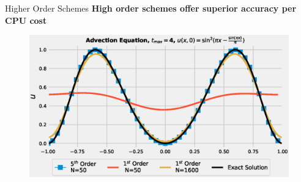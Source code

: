 \documentclass[10pt]{beamer}
\begin{document}
\begin{frame}{Higher Order Schemes}
  \centering 
  \textbf{High order schemes offer superior accuracy per CPU cost}
  
  \begin{table}[H]
    \centering
      \tabcolsep=0.3cm
  \end{table}
  \begin{figure}[H]
      \centering
      \includegraphics[scale=0.5]{AdvectionHighOrderComparison.eps}
    \end{figure}
\end{frame}
\end{document}
